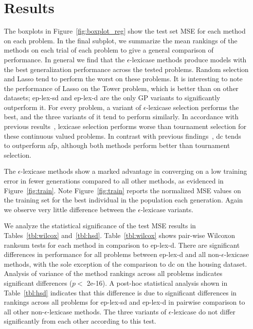 \documentclass[twoside]{article}
\begin{document}
\section{Results}\label{s:results}
The boxplots in Figure~\ref{fig:boxplot_reg} show the test set MSE for each method on each problem. In the final subplot, we summarize the mean rankings of the methods on each trial of each problem to give a general comparison of performance. In general we find that the $\epsilon$-lexicase methods produce models with the best generalization performance across the tested problems. Random selection and Lasso tend to perform the worst on these problems. It is interesting to note the performance of Lasso on the Tower problem, which is better than on other datasets; ep-lex-sd and ep-lex-d are the only GP variants to significantly outperform it. For every problem, a variant of $\epsilon$-lexicase selection performs the best, and the three variants of it tend to perform similarly. In accordance with previous results~\citep{la_cava_epsilon-lexicase_2016}, lexicase selection performs worse than tournament selection for these continuous valued problems. In contrast with previous findings~\citep{schmidt_age-fitness_2011}, dc tends to outperform afp, although both methods perform better than tournament selection. 

The $\epsilon$-lexicase methods show a marked advantage in converging on a low training error in fewer generations compared to all other methods, as evidenced in Figure~\ref{fig:train}. Note Figure~\ref{fig:train} reports the normalized MSE values on the training set for the best individual in the population each generation. Again we observe very little difference between the $\epsilon$-lexicase variants. 

We analyze the statistical significance of the test MSE results in Tables~\ref{tbl:wilcox} and~\ref{tbl:hsd}. Table~\ref{tbl:wilcox} shows pair-wise Wilcoxon ranksum tests for each method in comparison to ep-lex-d. There are significant differences in performance for all problems between ep-lex-d and all non-$\epsilon$-lexicase methods, with the sole exception of the comparison to dc on the housing dataset. Analysis of variance of the method rankings across all problems indicates significant differences ($p<$ 2e-16). A post-hoc statistical analysis shown in Table~\ref{tbl:hsd} indicates that this difference is due to significant differences in rankings across all problems for ep-lex-sd and ep-lex-d in pairwise comparison to all other non-$\epsilon$-lexicase methods. The three variants of $\epsilon$-lexicase do not differ significantly from each other according to this test.
\end{document}
